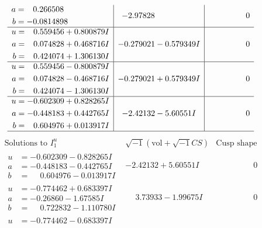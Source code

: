 \documentclass[1p]{elsarticle_modified}
\theoremstyle{definition}
\newcommand{\I}{\sqrt{-1}}
\begin{document}
$$\begin{array}{c|c|c}
\begin{aligned}
a &= \phantom{-}0.266508\phantom{ +0.000000I} \\
b &= -0.0814898\phantom{ +0.000000I}\end{aligned}
 & -2.97828\phantom{ +0.000000I} & \phantom{-0.000000 } 0 \\ \hline\begin{aligned}
u &= \phantom{-}0.559456 + 0.800879 I \\
a &= \phantom{-}0.074828 + 0.468716 I \\
b &= \phantom{-}0.424074 + 1.306130 I\end{aligned}
 & -0.279021 - 0.579349 I & \phantom{-0.000000 } 0 \\ \hline\begin{aligned}
u &= \phantom{-}0.559456 - 0.800879 I \\
a &= \phantom{-}0.074828 - 0.468716 I \\
b &= \phantom{-}0.424074 - 1.306130 I\end{aligned}
 & -0.279021 + 0.579349 I & \phantom{-0.000000 } 0 \\ \hline\begin{aligned}
u &= -0.602309 + 0.828265 I \\
a &= -0.448183 + 0.442765 I \\
b &= \phantom{-}0.604976 + 0.013917 I\end{aligned}
 & -2.42132 - 5.60551 I & \phantom{-0.000000 } 0\\
 \hline 
 \end{array}$$\newpage$$\begin{array}{c|c|c}  
\text{Solutions to }I^u_{1}& \I (\text{vol} + \sqrt{-1}CS) & \text{Cusp shape}\\
 \hline 
\begin{aligned}
u &= -0.602309 - 0.828265 I \\
a &= -0.448183 - 0.442765 I \\
b &= \phantom{-}0.604976 - 0.013917 I\end{aligned}
 & -2.42132 + 5.60551 I & \phantom{-0.000000 } 0 \\ \hline\begin{aligned}
u &= -0.774462 + 0.683397 I \\
a &= -0.26860 - 1.67585 I \\
b &= \phantom{-}0.722832 - 1.110780 I\end{aligned}
 & \phantom{-}3.73933 - 1.99675 I & \phantom{-0.000000 } 0 \\ \hline\begin{aligned}
u &= -0.774462 - 0.683397 I \\

\end{aligned}
\end{array}$$
\end{document}
